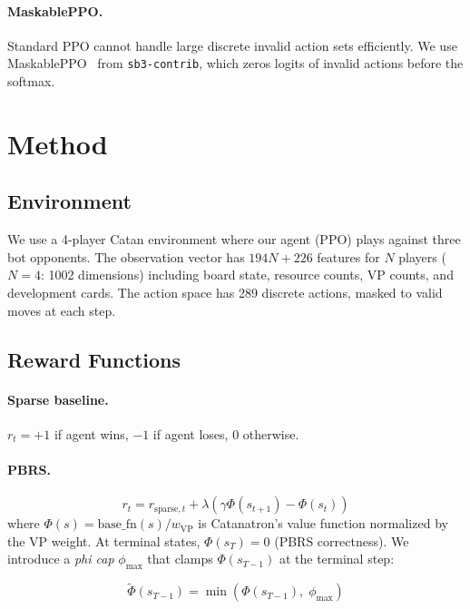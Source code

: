 \documentclass[10pt,twocolumn]{article}
\begin{document}
\paragraph{MaskablePPO.}
Standard PPO cannot handle large discrete invalid action sets efficiently.
We use MaskablePPO~\cite{huang2022maskableppo} from \texttt{sb3-contrib},
which zeros logits of invalid actions before the softmax.

\section{Method}

\subsection{Environment}

We use a 4-player Catan environment where our agent (PPO) plays against three
bot opponents. The observation vector has $194N + 226$ features for $N$ players
($N{=}4$: 1002 dimensions) including board state, resource counts, VP counts,
and development cards. The action space has 289 discrete actions, masked to
valid moves at each step.

\subsection{Reward Functions}

\paragraph{Sparse baseline.}
$r_t = +1$ if agent wins, $-1$ if agent loses, $0$ otherwise.

\paragraph{PBRS.}
\begin{equation}
  r_t = r_{\text{sparse},t} + \lambda(\gamma\Phi(s_{t+1}) - \Phi(s_t))
  \label{eq:pbrs}
\end{equation}
where $\Phi(s) = \text{base\_fn}(s) / w_{\text{VP}}$ is Catanatron's value
function normalized by the VP weight. At terminal states, $\Phi(s_T) = 0$
(PBRS correctness). We introduce a \emph{phi cap} $\phi_{\max}$ that clamps
$\Phi(s_{T-1})$ at the terminal step:

\begin{equation}
  \tilde{\Phi}(s_{T-1}) = \min(\Phi(s_{T-1}),\; \phi_{\max})
\end{equation}
\end{document}
